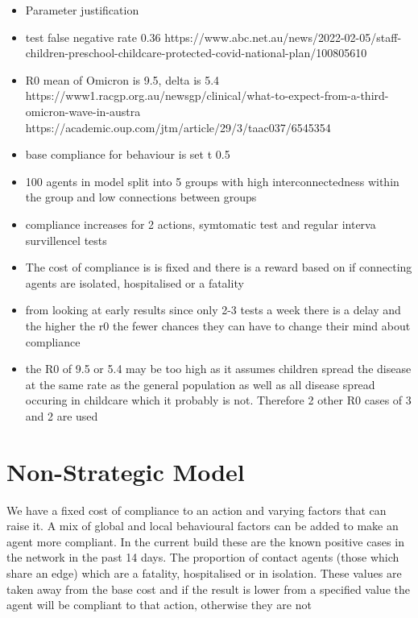 \documentclass{article}
\begin{document}
\begin{itemize}

\item Parameter justification
\item test false negative rate 0.36 https://www.abc.net.au/news/2022-02-05/staff-children-preschool-childcare-protected-covid-national-plan/100805610
\item R0 mean of Omicron is 9.5, delta is 5.4  https://www1.racgp.org.au/newsgp/clinical/what-to-expect-from-a-third-omicron-wave-in-austra https://academic.oup.com/jtm/article/29/3/taac037/6545354
\item base compliance for behaviour is set t 0.5
\item 100 agents in model split into 5 groups with high interconnectedness within the group and low connections between groups

\item compliance increases for 2 actions,  symtomatic test and regular interva survillencel tests
\item The cost of compliance is is fixed and there is a reward based on if connecting agents are isolated, hospitalised or a fatality

\item from looking at early results since only 2-3 tests a week there is a delay and the higher the r0 the fewer chances they can have to change their mind about compliance 

\item the R0 of 9.5 or 5.4 may be too high as it assumes children spread the disease at the same rate as the general population as well as all disease spread occuring in childcare which it probably is not. Therefore 2 other R0 cases of 3 and 2 are used 
\end{itemize}

\section{Non-Strategic Model}
We have a fixed cost of compliance to an action and varying factors that can raise it. A mix of global and local behavioural factors can be added to make an agent more compliant. In the current build these are the known positive cases in the network in the past 14 days. The proportion of contact agents (those which share an edge) which are a fatality, hospitalised or in isolation. These values are taken away from the base cost and if the result is lower from a specified value the agent will be compliant to that action, otherwise they are not
\end{document}
